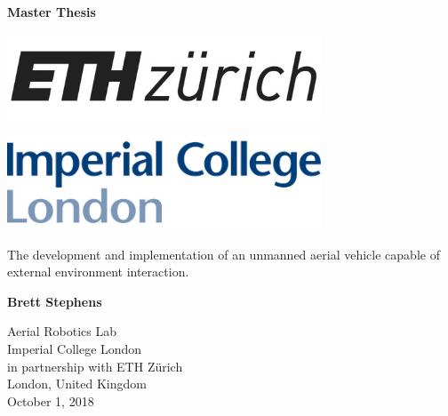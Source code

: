 \begin{titlepage}
    \begin{center}
        \vspace*{1cm}
        \huge
        \textbf{Master Thesis}
        \vspace*{1cm}
    \end{center}
    
    \begin{minipage}{.45\linewidth}
        \begin{flushleft}
            \includegraphics[width=0.7\textwidth]{images/ETHZurichLogo.png}
        \end{flushleft}
        
    \end{minipage}
    \hfill
    \begin{minipage}{.45\linewidth}
        \begin{flushright}
            \includegraphics[width=0.7\textwidth]{images/ImperialLogo.png}
        \end{flushright}
    \end{minipage}
    
    \begin{center}
    
        \vspace{1cm}
        \Large
        The development and implementation of an unmanned aerial vehicle capable of external environment interaction.  
        
        \vspace{1.5cm}
        
        \textbf{Brett Stephens}
        
        \vfill
        
        \vspace{0.8cm}
        
        \Large
        Aerial Robotics Lab\\
        Imperial College London\\
        in partnership with ETH Z{\"u}rich\\
        \vspace{0.8cm}
        London, United Kingdom\\
        October 1, 2018
        
    \end{center}
\end{titlepage}